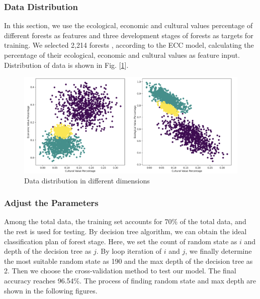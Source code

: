 \subsubsection{Data Distribution}
In this section, we use the ecological, economic and cultural values percentage of different forests as features and three development stages of forests as targets for training. We selected 2,214 forests \cite{data of forest}, according to the ECC model, calculating the percentage of their ecological, economic and cultural values as feature input. Distribution of data is shown in Fig. [\ref{Data distribution in different dimensions}].

\begin{figure}[H]
\centering
\includegraphics[scale = 0.4]{mcmthesis-demo/figures/Data.png}
\caption{Data distribution in different dimensions} 
\label{Data distribution in different dimensions}
\end{figure}

\subsubsection{Adjust the Parameters}
Among the total data, the training set accounts for 70\% of the total data, and the rest is used for testing. By decision tree algorithm, we can obtain the ideal classification plan of forest stage. Here, we set the count of random state as $i$ and depth of the decision tree as $j$.  By loop iteration of $i$ and $j$, we finally determine the most suitable random state as 190 and the max depth of the decision tree as 2. Then we choose the cross-validation method to test our model. The final accuracy reaches 96.54\%. The process of finding random state and max depth are shown in the following figures.

